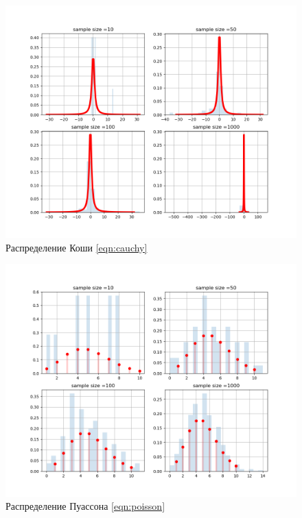 \documentclass[a4]{article}
\begin{document}
\begin{figure}[H]
    \centering
    \includegraphics[width=\textwidth]{Lab1_cauchy.png}
    \caption{Распределение Коши \eqref{eqn:cauchy}}
    \label{fig:dis_cauc_gis}
\end{figure}

\begin{figure}[H]
    \centering
    \includegraphics[width=\textwidth]{Lab1_poisson.png}
    \caption{Распределение Пуассона \eqref{eqn:poisson}}
    \label{fig:dis_pois_gis}
\end{figure}
\end{document}
